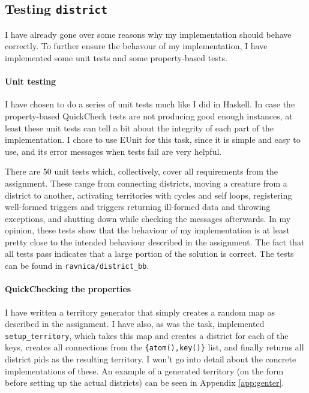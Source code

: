 \subsection*{Testing \texttt{district}}

I have already gone over some reasons why my implementation should behave correctly. To further ensure the behavour of my implementation, I have implemented some unit tests and some property-based tests.

\paragraph{Unit testing} I have chosen to do a series of unit tests much like I did in Haskell. In case the property-based QuickCheck tests are not producing good enough instances, at least these unit tests can tell a bit about the integrity of each part of the implementation. I chose to use EUnit for this task, since it is simple and easy to use, and its error messages when tests fail are very helpful.

There are 50 unit tests which, collectively, cover all requirements from the assignment. These range from connecting districts, moving a creature from a district to another, activating territories with cycles and self loops, registering well-formed triggers and triggers returning ill-formed data and throwing exceptions, and shutting down while checking the messages afterwards. In my opinion, these tests show that the behaviour of my implementation is at least pretty close to the intended behaviour described in the assignment. The fact that all tests pass indicates that a large portion of the solution is correct. The tests can be found in \texttt{ravnica/district\_bb}.


\paragraph{QuickChecking the properties} I have written a territory generator that simply creates a random map as described in the assignment. I have also, as was the task, implemented \texttt{setup\_territory}, which takes this map and creates a district for each of the keys, creates all connections from the \texttt{\{atom(),key()\}} list, and finally returns all district pids as the resulting territory. I won't go into detail about the concrete implementations of these. An example of a generated territory (on the form before setting up the actual districts) can be seen in Appendix \ref{app:genter}. \\

